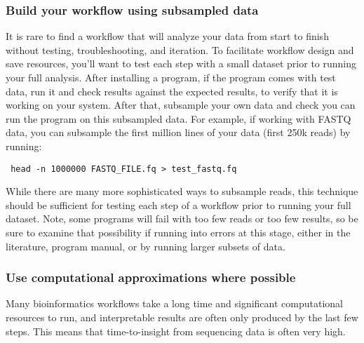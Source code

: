 \documentclass[10pt,letterpaper]{article}
\begin{document}
\subsubsection*{Build your workflow using subsampled data}

It is rare to find a workflow that will analyze your data from start to finish without testing, troubleshooting, and iteration. To facilitate workflow design and save resources, you'll want to test each step with a small dataset prior to running your full analysis. After installing a program, if the program comes with test data, run it and check results against the expected results, to verify that it is working on your system. After that, subsample your own data and check you can run the program on this subsampled data. For example, if working with FASTQ data, you can subsample the first million lines of your data (first 250k reads) by running:

 \begin{lstlisting}
 head -n 1000000 FASTQ_FILE.fq > test_fastq.fq 
\end{lstlisting}

While there are many more sophisticated ways to subsample reads, this technique should be sufficient for testing each step of a workflow prior to running your full dataset. Note, some programs will fail with too few reads or too few results, so be sure to examine that possibility if running into errors at this stage, either in the literature, program manual, or by running larger subsets of data.


\subsubsection*{Use computational approximations where possible}
 
 Many bioinformatics workflows take a long time and significant computational resources to run, and interpretable results are often only produced by the last few steps. This means that time-to-insight from sequencing data is often very high. 
 
\end{document}
